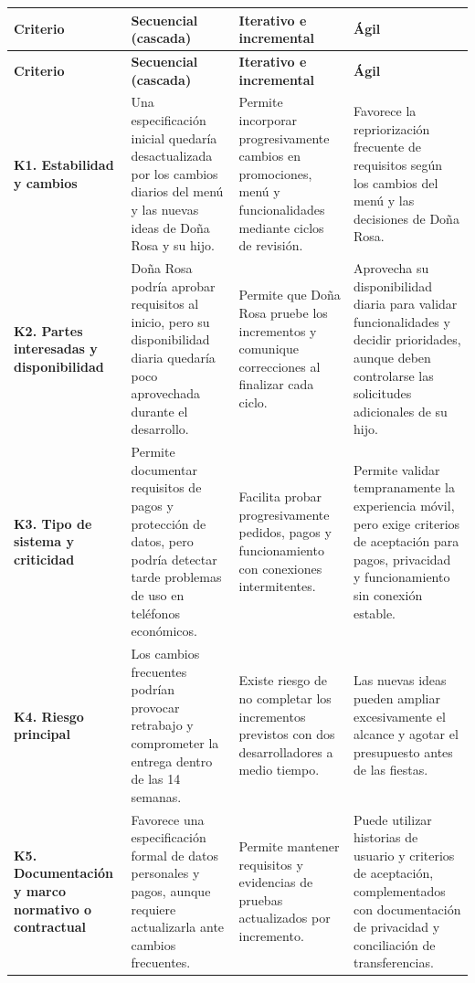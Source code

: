 \begin{longtable}{
|>{\raggedright\arraybackslash}p{}
|>{\raggedright\arraybackslash}p{}
|>{\raggedright\arraybackslash}p{}
|>{\raggedright\arraybackslash}p{}|}
\hline
\textbf{Criterio} &
\textbf{Secuencial (cascada)} &
\textbf{Iterativo e incremental} &
\textbf{Ágil} \\
\hline
\endfirsthead

\hline
\textbf{Criterio} &
\textbf{Secuencial (cascada)} &
\textbf{Iterativo e incremental} &
\textbf{Ágil} \\
\hline
\endhead

\textbf{K1. Estabilidad y cambios} &
Una especificación inicial quedaría desactualizada
por los cambios diarios del menú y las nuevas ideas
de Doña Rosa y su hijo. &
Permite incorporar progresivamente cambios en
promociones, menú y funcionalidades mediante
ciclos de revisión. &
Favorece la repriorización frecuente de requisitos
según los cambios del menú y las decisiones
de Doña Rosa. \\
\hline

\textbf{K2. Partes interesadas y disponibilidad} &
Doña Rosa podría aprobar requisitos al inicio,
pero su disponibilidad diaria quedaría poco
aprovechada durante el desarrollo. &
Permite que Doña Rosa pruebe los incrementos
y comunique correcciones al finalizar cada ciclo. &
Aprovecha su disponibilidad diaria para validar
funcionalidades y decidir prioridades, aunque
deben controlarse las solicitudes adicionales
de su hijo. \\
\hline

\textbf{K3. Tipo de sistema y criticidad} &
Permite documentar requisitos de pagos y protección
de datos, pero podría detectar tarde problemas
de uso en teléfonos económicos. &
Facilita probar progresivamente pedidos, pagos
y funcionamiento con conexiones intermitentes. &
Permite validar tempranamente la experiencia móvil,
pero exige criterios de aceptación para pagos,
privacidad y funcionamiento sin conexión estable. \\
\hline

\textbf{K4. Riesgo principal} &
Los cambios frecuentes podrían provocar retrabajo
y comprometer la entrega dentro de las 14 semanas. &
Existe riesgo de no completar los incrementos
previstos con dos desarrolladores a medio tiempo. &
Las nuevas ideas pueden ampliar excesivamente
el alcance y agotar el presupuesto antes
de las fiestas. \\
\hline

\textbf{K5. Documentación y marco normativo o contractual} &
Favorece una especificación formal de datos
personales y pagos, aunque requiere actualizarla
ante cambios frecuentes. &
Permite mantener requisitos y evidencias
de pruebas actualizados por incremento. &
Puede utilizar historias de usuario y criterios
de aceptación, complementados con documentación
de privacidad y conciliación de transferencias. \\
\hline

\end{longtable}

\normalsize
